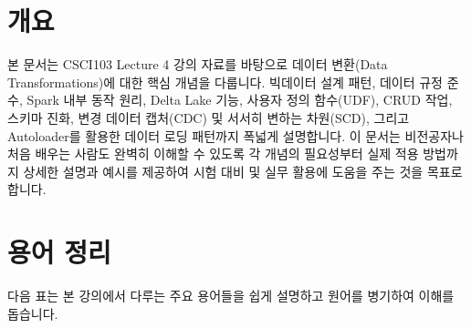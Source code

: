 \documentclass[11pt,a4paper]{article}
\begin{document}
\newpage
\section*{개요}
본 문서는 CSCI103 Lecture 4 강의 자료를 바탕으로 데이터 변환(Data Transformations)에 대한 핵심 개념을 다룹니다. 빅데이터 설계 패턴, 데이터 규정 준수, Spark 내부 동작 원리, Delta Lake 기능, 사용자 정의 함수(UDF), CRUD 작업, 스키마 진화, 변경 데이터 캡처(CDC) 및 서서히 변하는 차원(SCD), 그리고 Autoloader를 활용한 데이터 로딩 패턴까지 폭넓게 설명합니다. 이 문서는 비전공자나 처음 배우는 사람도 완벽히 이해할 수 있도록 각 개념의 필요성부터 실제 적용 방법까지 상세한 설명과 예시를 제공하여 시험 대비 및 실무 활용에 도움을 주는 것을 목표로 합니다.

\newpage
\section{용어 정리}
다음 표는 본 강의에서 다루는 주요 용어들을 쉽게 설명하고 원어를 병기하여 이해를 돕습니다.
\end{document}
